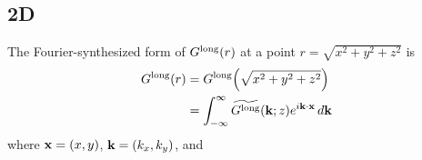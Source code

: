 \documentclass[letterpaper]{article}
\newcommand{\wt}{\widetilde}
\begin{document}
\subsection{2D}

The Fourier-synthesized form of $G^{\hbox{\scriptsize{long}}}(r)$ at
a point $r=\sqrt{x^2+y^2+z^2}$ is
\begin{align*}
 G\sups{long}(r)
   &=G\sups{long}\Big( \sqrt{x^2 + y^2 + z^2} \Big)
\\
   &=\int_{-\infty}^\infty \wt{G\sups{long}}(\vb k; z) e^{i\vb k \cdot \vb x} \, d\vb k
\end{align*}
where $\mathbf{x}=(x,y)$, $\mathbf{k}=(k_x, k_y)$, and 
%

\end{document}
